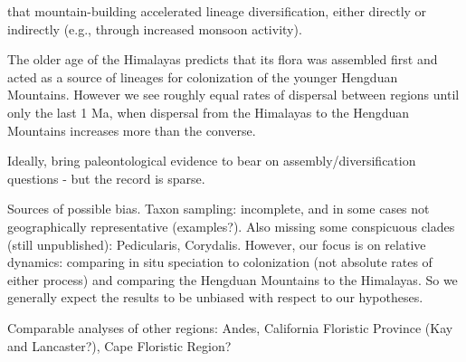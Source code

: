 that mountain-building accelerated lineage diversification, either directly or indirectly (e.g., through increased monsoon activity).



The older age of the Himalayas predicts that its flora was assembled first and acted as a source of lineages for colonization of the younger Hengduan Mountains. However we see roughly equal rates of dispersal between regions until only the last 1 Ma, when dispersal from the Himalayas to the Hengduan Mountains increases more than the converse. 



Ideally, bring paleontological evidence to bear on assembly/diversification questions - but the record is sparse.

Sources of possible bias. Taxon sampling: incomplete, and in some cases not geographically representative (examples?). Also missing some conspicuous clades (still unpublished): Pedicularis, Corydalis. However, our focus is on relative dynamics: comparing in situ speciation to colonization (not absolute rates of either process) and comparing the Hengduan Mountains to the Himalayas. So we generally expect the results to be unbiased with respect to our hypotheses.

Comparable analyses of other regions: Andes, California Floristic Province (Kay and Lancaster?), Cape Floristic Region?
